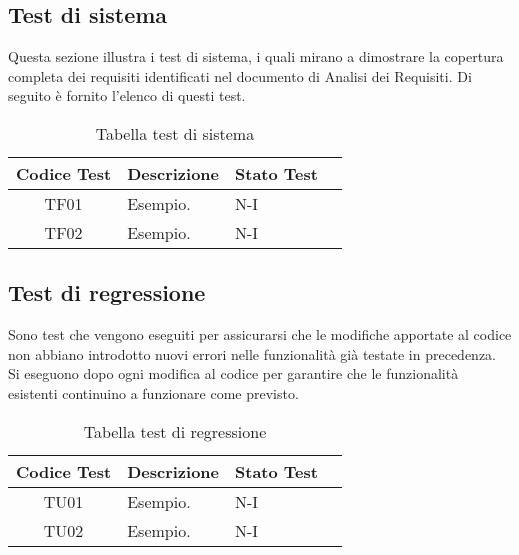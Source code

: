 \subsection{Test di sistema}Questa sezione illustra i test di sistema, i quali mirano a dimostrare la copertura completa dei requisiti identificati nel documento di Analisi dei Requisiti. Di seguito è fornito l'elenco di questi test.
\\
\begin{table}[htbp]
    \centering
    \begin{tabular}{|c|p{3cm}|p{5cm}|c|}
        \hline
        Codice Test & Descrizione & Stato Test \\
        \hline
        TF01 & Esempio. & N-I \\
        \hline
        TF02 & Esempio. & N-I \\
        \hline
    \end{tabular}
    \caption{Tabella test di sistema}
    \label{tab:testsSistema}
\end{table}

\subsection{Test di regressione}
Sono test che vengono eseguiti per assicurarsi che le modifiche apportate al codice non abbiano introdotto nuovi errori nelle funzionalità già testate in precedenza. Si eseguono dopo ogni modifica al codice per garantire che le funzionalità esistenti continuino a funzionare come previsto.
\\
\begin{table}[htbp]
    \centering
    \begin{tabular}{|c|p{3cm}|p{5cm}|c|}
        \hline
        Codice Test & Descrizione & Stato Test \\
        \hline
        TU01 & Esempio. & N-I \\
        \hline
        TU02 & Esempio. & N-I \\
        \hline
    \end{tabular}
    \caption{Tabella test di regressione}
    \label{tab:testsRegressione}
\end{table}

